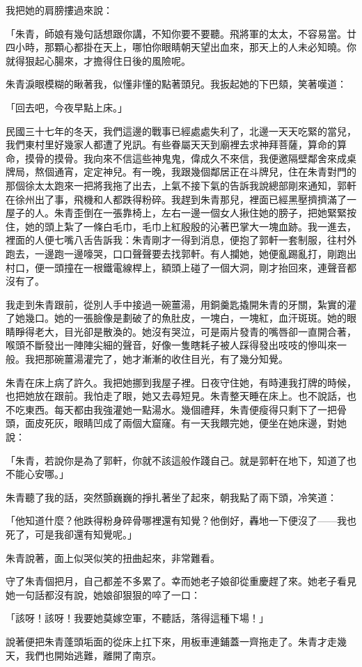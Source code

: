 我把她的肩膀摟過來說：

「朱青，師娘有幾句話想跟你講，不知你要不要聽。飛將軍的太太，不容易當。廿四小時，那顆心都掛在天上，哪怕你眼睛朝天望出血來，那天上的人未必知曉。你就得狠起心腸來，才擔得住日後的風險呢。

朱青淚眼模糊的瞅著我，似懂非懂的點著頭兒。我扳起她的下巴頦，笑著嘆道：

「回去吧，今夜早點上床。」

民國三十七年的冬天，我們這邊的戰事已經處處失利了，北邊一天天吃緊的當兒，我們東村里好幾家人都遭了兇訊。有些眷屬天天到廟裡去求神拜菩薩，算命的算命，摸骨的摸骨。我向來不信這些神鬼鬼，偉成久不來信，我便邀隔壁鄰舍來成桌牌局，熬個通宵，定定神兒。有一晚，我跟幾個鄰居正在斗牌兒，住在朱青對門的那個徐太太跑來一把將我拖了出去，上氣不接下氣的告訴我說總部剛來通知，郭軒在徐州出了事，飛機和人都跌得粉碎。我趕到朱青那兒，裡面已經黑壓擠擠滿了一屋子的人。朱青歪倒在一張靠椅上，左右一邊一個女人揪住她的膀子，把她緊緊按住，她的頭上紮了一條白毛巾，毛巾上紅殷殷的沁著巴掌大一塊血跡。我一進去，裡面的人便七嘴八舌告訴我：朱青剛才一得到消息，便抱了郭軒一套制服，往村外跑去，一邊跑一邊嚎哭，口口聲聲要去找郭軒。有人攔她，她便亂踢亂打，剛跑出村口，便一頭撞在一根鐵電線桿上，額頭上碰了一個大洞，剛才抬回來，連聲音都沒有了。

我走到朱青跟前，從別人手中接過一碗薑湯，用銅羹匙撬開朱青的牙關，紮實的灌了她幾口。她的一張臉像是劃破了的魚肚皮，一塊白，一塊紅，血汗斑斑。她的眼睛睜得老大，目光卻是散渙的。她沒有哭泣，可是兩片發青的嘴唇卻一直開合著，喉頭不斷發出一陣陣尖細的聲音，好像一隻瞎耗子被人踩得發出吱吱的慘叫來一般。我把那碗薑湯灌完了，她才漸漸的收住目光，有了幾分知覺。


朱青在床上病了許久。我把她挪到我屋子裡。日夜守住她，有時連我打牌的時候，也把她放在跟前。我怕走了眼，她又去尋短見。朱青整天睡在床上。也不說話，也不吃東西。每天都由我強灌她一點湯水。幾個禮拜，朱青便瘦得只剩下了一把骨頭，面皮死灰，眼睛凹成了兩個大窟窿。有一天我餵完她，便坐在她床邊，對她說：

「朱青，若說你是為了郭軒，你就不該這般作踐自己。就是郭軒在地下，知道了也不能心安哪。」

朱青聽了我的話，突然顫巍巍的掙扎著坐了起來，朝我點了兩下頭，冷笑道：

「他知道什麼？他跌得粉身碎骨哪裡還有知覺？他倒好，轟地一下便沒了——我也死了，可是我卻還有知覺呢。」

朱青說著，面上似哭似笑的扭曲起來，非常難看。

守了朱青個把月，自己都差不多累了。幸而她老子娘卻從重慶趕了來。她老子看見她一句話都沒有說，她娘卻狠狠的啐了一口：

「該呀！該呀！我要她莫嫁空軍，不聽話，落得這種下場！」

說著便把朱青蓬頭垢面的從床上扛下來，用板車連鋪蓋一齊拖走了。朱青才走幾天，我們也開始逃難，離開了南京。

\fussy